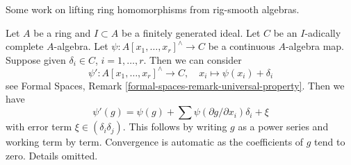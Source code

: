 \noindent
Some work on lifting ring homomorphisms from rig-smooth algebras.

\begin{remark}
\label{remark-linear-approximation}
Let $A$ be a ring and $I \subset A$ be a finitely generated ideal.
Let $C$ be an $I$-adically complete $A$-algebra.
Let $\psi : A[x_1, \ldots, x_r]^\wedge \to C$ be a continuous
$A$-algebra map. Suppose given $\delta_i \in C$, $i = 1, \ldots, r$.
Then we can consider
$$
\psi' : A[x_1, \ldots, x_r]^\wedge \to C,\quad
x_i \longmapsto \psi(x_i) + \delta_i
$$
see Formal Spaces, Remark \ref{formal-spaces-remark-universal-property}.
Then we have
$$
\psi'(g) = \psi(g) + \sum \psi(\partial g/\partial x_i)\delta_i + \xi
$$
with error term $\xi \in (\delta_i\delta_j)$. This follows by
writing $g$ as a power series and working term by term. Convergence
is automatic as the coefficients of $g$ tend to zero.
Details omitted.
\end{remark}

